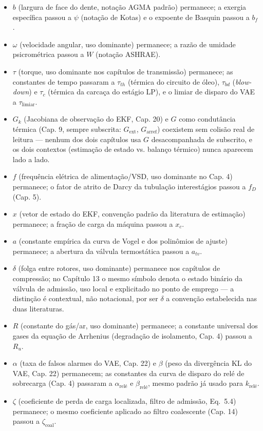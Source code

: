 \documentclass[12pt,a4paper]{article}
\numberwithin{equation}{section}
\numberwithin{table}{section}
\numberwithin{figure}{section}
\begin{document}
{\begin{itemize}
	\item $b$ (largura de face do dente, notação AGMA padrão) permanece; a exergia específica passou a $\psi$ (notação de Kotas) e o expoente de Basquin passou a $b_f$.
	\item $\omega$ (velocidade angular, uso dominante) permanece; a razão de umidade psicrométrica passou a $W$ (notação ASHRAE).
	\item $\tau$ (torque, uso dominante nos capítulos de transmissão) permanece; as constantes de tempo passaram a $\tau_{th}$ (térmica do circuito de óleo), $\tau_{bd}$ (\textit{blow-down}) e $\tau_c$ (térmica da carcaça do estágio LP), e o limiar de disparo do VAE a $\tau_{\text{limiar}}$.
	\item $G_k$ (Jacobiana de observação do EKF, Cap. 20) e $G$ como condutância térmica (Cap. 9, sempre subscrita: $G_{\text{ext}}$, $G_{\text{arref}}$) coexistem sem colisão real de leitura — nenhum dos dois capítulos usa $G$ desacompanhada de subscrito, e os dois contextos (estimação de estado vs. balanço térmico) nunca aparecem lado a lado.
	\item $f$ (frequência elétrica de alimentação/VSD, uso dominante no Cap. 4) permanece; o fator de atrito de Darcy da tubulação interestágios passou a $f_D$ (Cap. 5).
	\item $x$ (vetor de estado do EKF, convenção padrão da literatura de estimação) permanece; a fração de carga da máquina passou a $x_c$.
	\item $a$ (constante empírica da curva de Vogel e dos polinômios de ajuste) permanece; a abertura da válvula termostática passou a $a_{tv}$.
	\item $\delta$ (folga entre rotores, uso dominante) permanece nos capítulos de compressão; no Capítulo 13 o mesmo símbolo denota o estado binário da válvula de admissão, uso local e explicitado no ponto de emprego — a distinção é contextual, não notacional, por ser $\delta$ a convenção estabelecida nas duas literaturas.
	\item $R$ (constante do gás/ar, uso dominante) permanece; a constante universal dos gases da equação de Arrhenius (degradação de isolamento, Cap. 4) passou a $R_u$.
	\item $\alpha$ (taxa de falsos alarmes do VAE, Cap. 22) e $\beta$ (peso da divergência KL do VAE, Cap. 22) permanecem; as constantes da curva de disparo do relé de sobrecarga (Cap. 4) passaram a $\alpha_{\text{relé}}$ e $\beta_{\text{relé}}$, mesmo padrão já usado para $k_{\text{relé}}$.
	\item $\zeta$ (coeficiente de perda de carga localizada, filtro de admissão, Eq.~5.4) permanece; o mesmo coeficiente aplicado ao filtro coalescente (Cap. 14) passou a $\zeta_{\text{coal}}$.

\end{itemize}}
\end{document}
